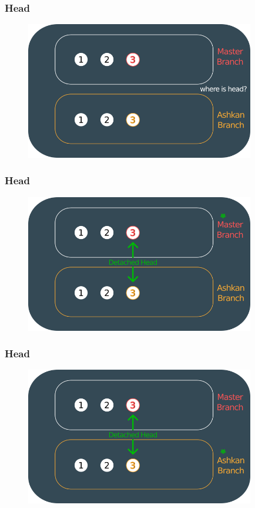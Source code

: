 \documentclass{beamer}
\begin{document}
	\begin{frame}
		\frametitle{Head}
		\begin{figure}[htbp]
			\centering
			\includegraphics[width=10cm]{head6}
		\end{figure}
	\end{frame}
	
	\begin{frame}
		\frametitle{Head}
		\begin{figure}[htbp]
			\centering
			\includegraphics[width=10cm]{head7}
		\end{figure}
	\end{frame}
	
	\begin{frame}
		\frametitle{Head}
		\begin{figure}[htbp]
			\centering
			\includegraphics[width=10cm]{head8}
		\end{figure}
	\end{frame}
	
\end{document}

